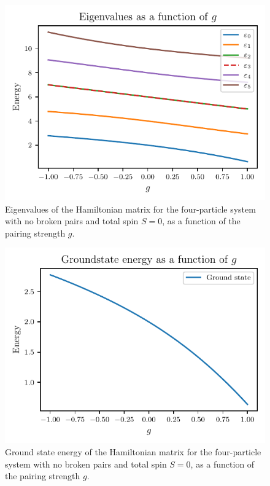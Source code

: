 \begin{figure}[htbp]
    \centering
    \includegraphics{figures/b_eigenvalues_energy.pdf}
    \caption{
        Eigenvalues of the Hamiltonian matrix for the four-particle system with no broken pairs and total spin $S = 0$, as a function of the pairing strength $g$.\label{fig:b_eigenvalues}
    }
\end{figure}

\begin{figure}[htbp]
    \centering
    \includegraphics{figures/b_ground_state_energy.pdf}
    \caption{
        Ground state energy of the Hamiltonian matrix for the four-particle system with no broken pairs and total spin $S = 0$, as a function of the pairing strength $g$.\label{fig:b_groundstate}
    }
\end{figure}

